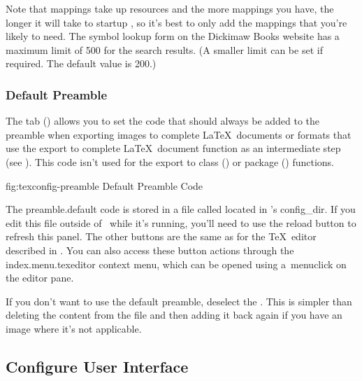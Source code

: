 \begin{warning}
Note that mappings take up resources and the more mappings you have,
the longer it will take to startup \FlowframTk, so it's best to only
add the mappings that you're likely to need. The symbol lookup form
on the Dickimaw Books website has a maximum limit of 500 for the search
results. (A smaller limit can be set if required. The default value
is 200.)
\end{warning}

\subsubsection{Default Preamble}\label{sec:texconfigpreamble}


The  tab
() allows you to set the
 code that
should always be added to the preamble when exporting images to
complete \LaTeX\ documents or formats that use the export to
complete \LaTeX\ document function as an intermediate step (see
). This code isn't used for the export to
class () or package () functions.

\FloatFig
  {fig:texconfig-preamble}
  {}
  {Default Preamble Code}

The \gls{preamble.default} code is stored in a file called
 located in \FlowframTk's \gls{config_dir}. If you edit
this file outside of \FlowframTk\ while it's running, you'll need to use the reload
button to refresh this panel. The other buttons are the same as for
the \TeX\ editor described in .  You can
also access these button actions through the
\gls{index.menu.texeditor} context menu, which can be opened using
a~\gls{menuclick} on the editor pane.


If you don't want to use the default preamble, deselect the
. This is simpler than
deleting the content from the file and then adding it back again if
you have an image where it's not applicable.

\subsection{Configure User Interface}\label{sec:configureuidialog}

